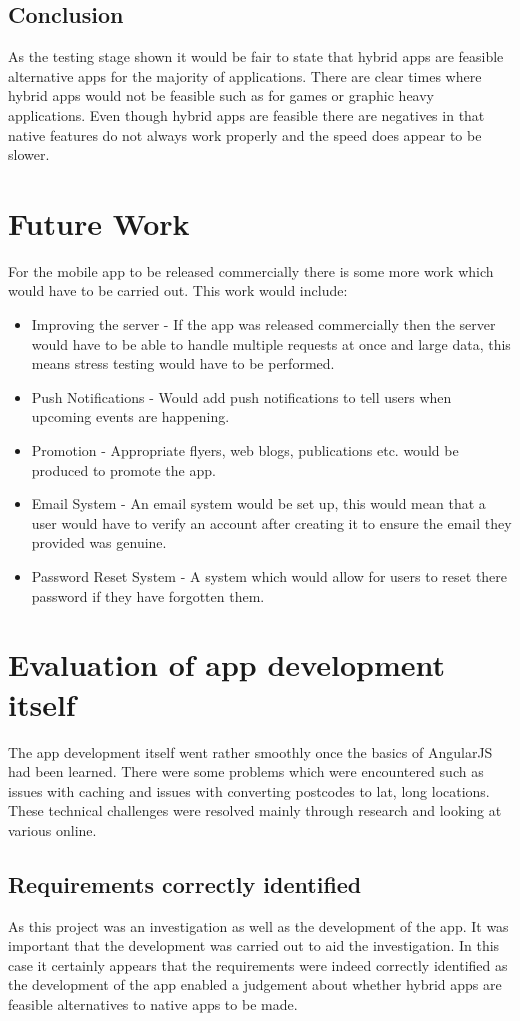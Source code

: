 \subsection{Conclusion}
As the testing stage shown it would be fair to state that hybrid apps are feasible alternative apps for the majority of applications. There are clear times where hybrid apps would not be feasible such as for games or graphic heavy applications. Even though hybrid apps are feasible there are negatives in that native features do not always work properly and the speed does appear to be slower.

\section{Future Work}
For the mobile app to be released commercially there is some more work which would have to be carried out. This work would include:
\begin{itemize}
\item Improving the server - If the app was released commercially then the server would have to be able to handle multiple requests at once and large data, this means stress testing would have to be performed.
\item Push Notifications - Would add push notifications to tell users when upcoming events are happening.
\item Promotion - Appropriate flyers, web blogs, publications etc. would be produced to promote the app.
\item Email System - An email system would be set up, this would mean that a user would have to verify an account after creating it to ensure the email they provided was genuine.
\item Password Reset System - A system which would allow for users to reset there password if they have forgotten them.
\end{itemize} 

\section{Evaluation of app development itself}
The app development itself went rather smoothly once the basics of AngularJS had been learned. There were some problems which were encountered such as issues with caching and issues with converting postcodes to lat, long locations. These technical challenges were resolved mainly through research and looking at various online.      
\subsection{Requirements correctly identified}
As this project was an investigation as well as the development of the app. It was important that the development was carried out to aid the investigation. In this case it certainly appears that the requirements were indeed correctly identified as the development of the app enabled a judgement about whether hybrid apps are feasible alternatives to native apps to be made.


